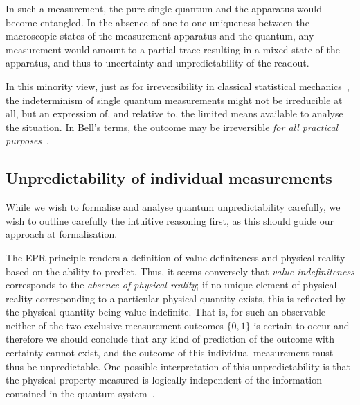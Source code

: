 \documentclass[%
 superscriptaddress,
 preprint,
 showpacs,
 showkeys,
 preprintnumbers,
  amsmath,amssymb,
  aps,
 pra,
  longbibliography,
  floatfix,
 ]{revtex4-1}
\theoremstyle{definition}
\begin{document}

In such a measurement, the pure single quantum and the apparatus would become entangled.
In the absence of one-to-one uniqueness between the macroscopic states of the measurement apparatus and the quantum, any measurement would amount to a partial trace resulting in a mixed state of the apparatus, and thus to uncertainty and unpredictability of the readout.

In this minority view, just as for irreversibility in classical statistical mechanics~\cite{Myrvold2011237}, the indeterminism of single quantum measurements might not be irreducible at all, but  an expression of, and relative to, the limited means available to analyse the situation.
In Bell's terms, the outcome may be irreversible {\em for all practical purposes}~\cite{bell-a}.


\subsection{Unpredictability of individual measurements}
\label{sec:physUnpred}

While we wish to formalise and analyse quantum unpredictability carefully, we wish to outline carefully the intuitive reasoning first, as this should guide our approach at formalisation.

The EPR principle renders a definition of value definiteness and physical reality based on the ability to predict.
Thus, it seems conversely that \emph{value indefiniteness} corresponds to the {\em absence of physical reality};
if no unique element of physical reality corresponding to a particular physical quantity exists, this is reflected by the physical quantity being value indefinite.
That is, for such an observable neither of the two exclusive measurement outcomes $\{0,1\}$ is certain to occur and therefore we should conclude that any kind of prediction of the outcome with certainty cannot exist, and the outcome of this individual measurement must thus be unpredictable.
One possible interpretation of this unpredictability is that the physical property measured is logically independent of the information contained in the quantum system~\cite{1367-2630-12-1-013019}.%
\end{document}
